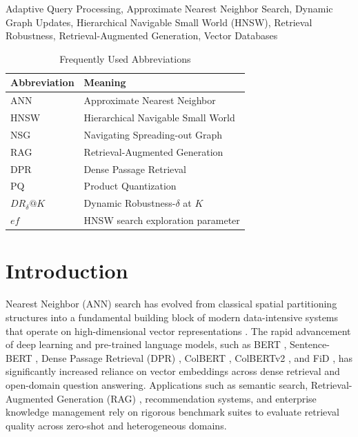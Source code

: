 \documentclass{ieeeaccess}
\begin{document}
\begin{keywords}
Adaptive Query Processing, Approximate Nearest Neighbor Search, Dynamic Graph Updates, Hierarchical Navigable Small World (HNSW), Retrieval Robustness, Retrieval-Augmented Generation, Vector Databases
\end{keywords}

\titlepgskip=-15pt

\maketitle

\begin{table}[!t]
\centering
\caption{Frequently Used Abbreviations}
\label{tab:abbrev}
\small
\begin{tabular}{ll}
\toprule
Abbreviation & Meaning \\
\midrule
ANN & Approximate Nearest Neighbor \\
HNSW & Hierarchical Navigable Small World \\
NSG & Navigating Spreading-out Graph \\
RAG & Retrieval-Augmented Generation \\
DPR & Dense Passage Retrieval \\
PQ & Product Quantization \\
$DR_{\delta}@K$ & Dynamic Robustness-$\delta$ at $K$ \\
$ef$ & HNSW search exploration parameter \\
\bottomrule
\end{tabular}
\end{table}

\section{Introduction}
\label{sec:introduction}

 Nearest Neighbor (ANN) search has evolved from classical spatial partitioning structures \cite{Bentley1975, Friedman1977, Arya1998, Indyk1998} into a fundamental building block of modern data-intensive systems that operate on high-dimensional vector representations \cite{Xiao2024, VectorSurvey2024}. The rapid advancement of deep learning and pre-trained language models, such as BERT \cite{Devlin2019}, Sentence-BERT \cite{Reimers2019}, Dense Passage Retrieval (DPR) \cite{Karpukhin2020}, ColBERT \cite{Khattab2020}, ColBERTv2 \cite{Santhanam2022}, and FiD \cite{Izacard2021}, has significantly increased reliance on vector embeddings across dense retrieval \cite{Chen2024} and open-domain question answering. Applications such as semantic search, Retrieval-Augmented Generation (RAG) \cite{Lewis2020, Lewis2020_52, Gao2023_50, Zhao2024_40, Zhao2024_51, RAGSurvey2024, Guo2024_27, Ahn2022Access}, recommendation systems, and enterprise knowledge management rely on rigorous benchmark suites \cite{Thakur2021, Muennighoff2023, Lin2021} to evaluate retrieval quality across zero-shot and heterogeneous domains.
\end{document}
